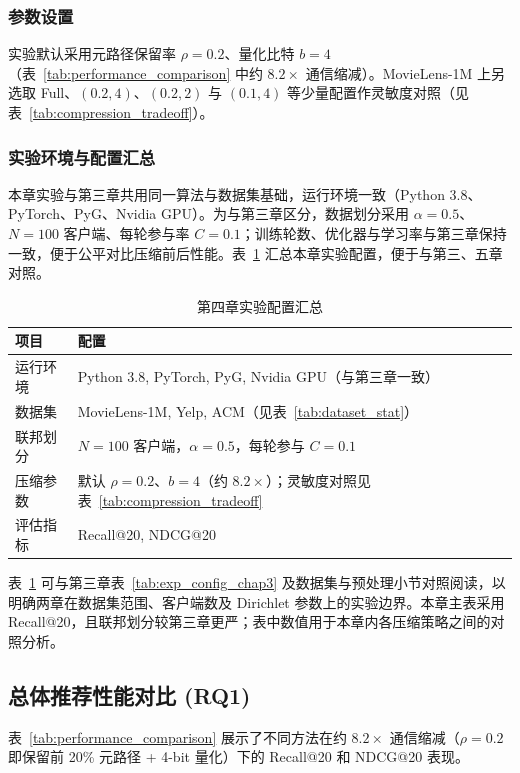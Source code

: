 \subsubsection{参数设置}
实验默认采用元路径保留率 $\rho=0.2$、量化比特 $b=4$（表~\ref{tab:performance_comparison} 中约 $8.2\times$ 通信缩减）。MovieLens-1M 上另选取 Full、$(0.2,4)$、$(0.2,2)$ 与 $(0.1,4)$ 等少量配置作灵敏度对照（见表~\ref{tab:compression_tradeoff}）。

\subsubsection{实验环境与配置汇总}
本章实验与第三章共用同一算法与数据集基础，运行环境一致（Python 3.8、PyTorch、PyG、Nvidia GPU）。为与第三章区分，数据划分采用 $\alpha=0.5$、$N=100$ 客户端、每轮参与率 $C=0.1$；训练轮数、优化器与学习率与第三章保持一致，便于公平对比压缩前后性能。表~\ref{tab:exp_config_chap4} 汇总本章实验配置，便于与第三、五章对照。

\begin{table}[H]
    \centering
    \caption{第四章实验配置汇总}
    \label{tab:exp_config_chap4}
    \begin{tabular}{ll}
        \toprule
        项目 & 配置 \\
        \midrule
        运行环境 & Python 3.8, PyTorch, PyG, Nvidia GPU（与第三章一致） \\
        数据集 & MovieLens-1M, Yelp, ACM（见表~\ref{tab:dataset_stat}） \\
        联邦划分 & $N=100$ 客户端，$\alpha=0.5$，每轮参与 $C=0.1$ \\
        压缩参数 & 默认 $\rho=0.2$、$b=4$（约 $8.2\times$）；灵敏度对照见表~\ref{tab:compression_tradeoff} \\
        评估指标 & Recall@20, NDCG@20 \\
        \bottomrule
    \end{tabular}
\end{table}

表~\ref{tab:exp_config_chap4} 可与第三章表~\ref{tab:exp_config_chap3} 及数据集与预处理小节对照阅读，以明确两章在数据集范围、客户端数及 Dirichlet 参数上的实验边界。本章主表采用 Recall@20，且联邦划分较第三章更严；表中数值用于本章内各压缩策略之间的对照分析。

\subsection{总体推荐性能对比 (RQ1)}

表~\ref{tab:performance_comparison} 展示了不同方法在约 $8.2\times$ 通信缩减（$\rho=0.2$ 即保留前 20\% 元路径 + 4-bit 量化）下的 Recall@20 和 NDCG@20 表现。

